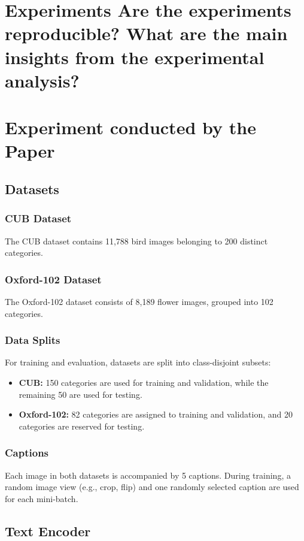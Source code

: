 \section*{Experiments Are the experiments reproducible? What are the main insights from the experimental analysis?}

\section*{Experiment conducted by the Paper}

\subsection*{Datasets}

\subsubsection*{CUB Dataset}
The CUB dataset contains 11,788 bird images belonging to 200 distinct categories. 

\subsubsection*{Oxford-102 Dataset}
The Oxford-102 dataset consists of 8,189 flower images, grouped into 102 categories.

\subsubsection*{Data Splits}
For training and evaluation, datasets are split into class-disjoint subsets:  
\begin{itemize}
    \item \textbf{CUB:} 150 categories are used for training and validation, while the remaining 50 are used for testing.
    \item \textbf{Oxford-102:} 82 categories are assigned to training and validation, and 20 categories are reserved for testing.
\end{itemize}

\subsubsection*{Captions}
Each image in both datasets is accompanied by 5 captions. During training, a random image view (e.g., crop, flip) and one randomly selected caption are used for each mini-batch.

\subsection*{Text Encoder}

